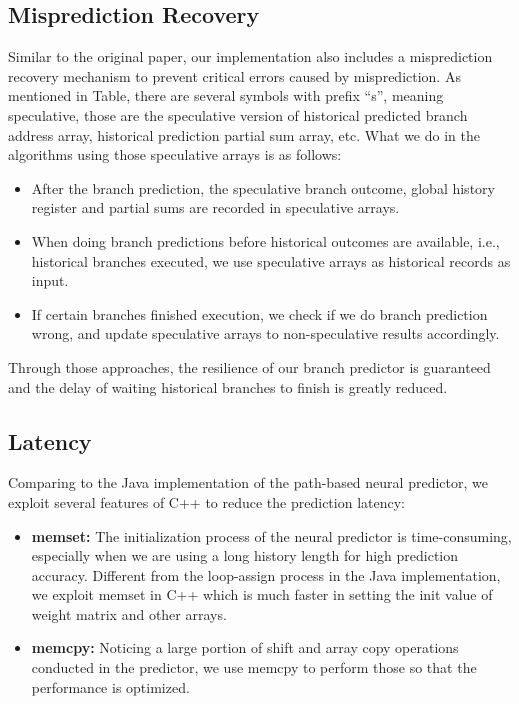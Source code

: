 \documentclass[conference]{IEEEtran}
\begin{document}
\subsection{Misprediction Recovery}
Similar to the original paper, our implementation also includes a misprediction recovery mechanism to prevent critical errors caused by misprediction. As mentioned in Table, there are several symbols with prefix ``s'', meaning speculative, those are the speculative version of historical predicted branch address array, historical prediction partial sum array, etc. What we do in the algorithms using those speculative arrays is as follows:
\begin{itemize}
	\item After the branch prediction, the speculative branch outcome, global history register and partial sums are recorded in speculative arrays.
	\item When doing branch predictions before historical outcomes are available, i.e., historical branches executed, we use speculative arrays as historical records as input.
	\item If certain branches finished execution, we check if we do branch prediction wrong, and update speculative arrays to non-speculative results accordingly.
\end{itemize}
Through those approaches, the resilience of our branch predictor is guaranteed and the delay of waiting historical branches to finish is greatly reduced.

\subsection{Latency}
Comparing to the Java implementation \cite{javapathpre} of the path-based neural predictor, we exploit several features of C++ to reduce the prediction latency:
\begin{itemize}
	\item {\bf memset: }The initialization process of the neural predictor is time-consuming, especially when we are using a long history length for high prediction accuracy. Different from the loop-assign process in the Java implementation, we exploit memset in C++ which is much faster in setting the init value of weight matrix and other arrays.
	\item {\bf memcpy: }Noticing a large portion of shift and array copy operations conducted in the predictor, we use memcpy to perform those so that the performance is optimized.
\end{itemize}
\end{document}
